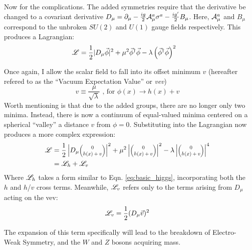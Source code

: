     Now for the complications.
    The added symmetries require that the derivative be changed to a covariant derivative 
        $D_{\mu} = \partial_{\mu} - \frac{ig}{2} \mathcal{A}^a_{\mu} \sigma^a - \frac{ig'}{2} B_{\mu}$.
    Here, $\mathcal{A}^a_\mu$ and $B_\mu$ correspond to the unbroken $SU(2)$ and $U(1)$ gauge fields respectively.
    This produces a Lagrangian:
    \begin{equation} \begin{split}
        \mathscr{L} &= \frac{1}{2} |D_{\mu} \vec{\phi}|^2 +
            \mu^2 \vec{\phi}^\dag \vec{\phi} - \lambda \left( \vec{\phi}^\dag\vec{\phi} \right)^2
    \end{split} \end{equation}


    Once again, I allow the scalar field to fall into its offset minimum $v$
        (hereafter refered to as the ``Vacuum Expectation Value'' or \textit{vev})
    \begin{equation}
        v \equiv \frac{\mu}{\sqrt{\lambda}} \textrm{ , for } \phi(x) \to h(x) + v
    \end{equation}
    Worth mentioning is that due to the added groups, there are no longer only two minima.
    Instead, there is now a continuum of equal-valued minima centered on a spherical ``valley'' a distance $v$ from $\phi=0$.
    Substituting into the Lagrangian now produces a more complex expression:
    \begin{equation} \begin{split}
        \label{eq:fullHiggs}
        \Lag & = \frac{1}{2} \left|D_{\mu} \minimatrix{0\\h(x)+v}\right|^2
            + \mu^2 \left|\minimatrix{0\\h(x)+v}\right|^2
            - \lambda \left|\minimatrix{0\\h(x)+v}\right|^4 \\
         & = \Lag_h + \Lag_v
    \end{split} \end{equation}
    Where $\mathscr{L}_h$ takes a form similar to Eqn. \ref{eq:basic_higgs}, incorporating both the $h$ and $h$/$v$ cross terms.
    Meanwhile, $\mathscr{L}_v$ refers only to the terms arising from $D_{\mu}$ acting on the vev:
    \begin{equation}
        \label{eq:lagv}
        \mathscr{L}_v = \frac{1}{2} (D_{\mu} \vec{v})^2
    \end{equation}

    The expansion of this term specifically will lead to the breakdown of Electro-Weak Symmetry,
        and the $W$ and $Z$ bosons acquiring mass.

